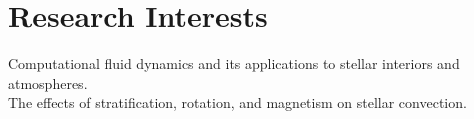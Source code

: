\section{Research Interests}

Computational fluid dynamics and its applications to stellar interiors and atmospheres.\\
The effects of stratification, rotation, and magnetism on stellar convection.

